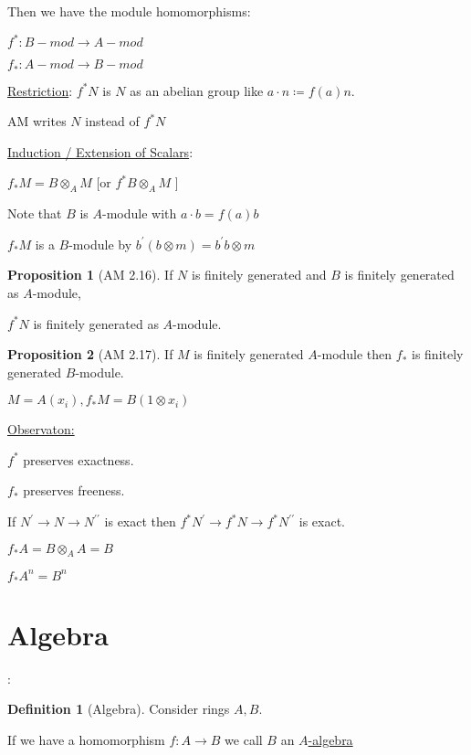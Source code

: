 \documentclass{article}
\theoremstyle{definition}
\newtheorem{definition}{Definition}
\newtheorem{proposition}{Proposition}
\begin{document}
Then we have the module homomorphisms:

\(f^{\ast}:B-mod \to A-mod\) 

\(f_{\ast}:A-mod \to B-mod\)

\underline{Restriction}: \(f^{\ast} N\) is \(N\) as an abelian group like \(a\cdot n \coloneqq f(a)n\).

AM writes \(N\) instead of \(f^{\ast} N\) 

\underline{Induction / Extension of Scalars}:

\(f_{\ast} M = B \otimes_A M\) [or \(f^{\ast} B \otimes _A M\) ]

Note that \(B\) is \(A\)-module with \(a\cdot b = f(a)b\) 

\(f_{\ast} M\) is a \(B\)-module by \(b^{\prime} (b \otimes m) = b^{\prime} b \otimes m\) 

\begin{proposition}
    [AM 2.16]

    If \(N\) is finitely generated and \(B\) is finitely generated as \(A\)-module,

    \(f^{\ast} N\) is finitely generated as \(A\)-module.
\end{proposition}

\begin{proposition}
    [AM 2.17]

    If \(M\) is finitely generated \(A\)-module then \(f_{\ast} \) is finitely generated \(B\)-module.
\end{proposition}

\(M = A(x_i), f_{\ast} M = B(1 \otimes x_i)\) 

\underline{Observaton:}

\(f^{\ast} \) preserves exactness.

\(f_{\ast}\) preserves freeness.

If \(N^{\prime} \to N \to N^{\prime\prime}\) is exact then \(f^{\ast} N^{\prime} \to f^{\ast} N \to f^{\ast} N^{\prime\prime}\) is exact.

\(f_{\ast} A = B \otimes_A A = B\) 

\(f_{\ast} A^n = B^n\) 

\section*{Algebra}:

\begin{definition}[Algebra]
    Consider rings \(A,B\).

    If we have a homomorphism \(f:A \to B\) we call \(B\) an \underline{\(A\)-algebra} 
\end{definition}
\end{document}
